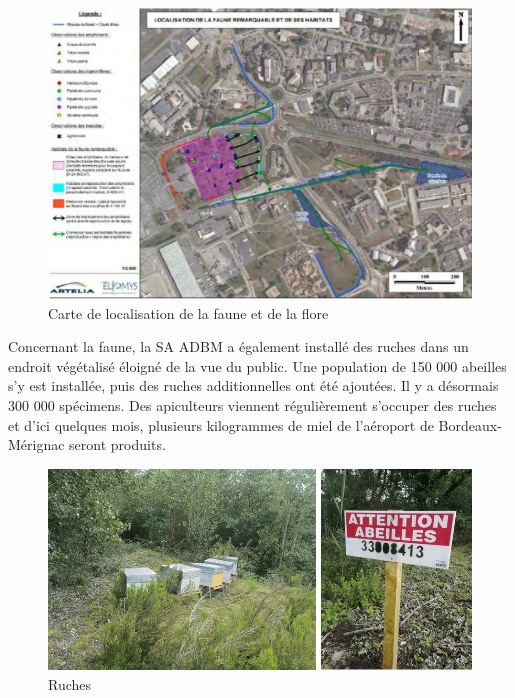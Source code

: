 \begin{figure}[hbt!]
  \centering
  \includegraphics[width=14cm]{Images/carteenvironnement.png}
  \caption{Carte de localisation de la faune et de la flore}
  \label{fig:crapeau}
\end{figure}

Concernant la faune, la SA ADBM a également installé des ruches dans un endroit végétalisé éloigné de la vue du public. Une population de 150 000 abeilles s'y est installée, puis des ruches additionnelles ont été ajoutées. Il y a désormais 300 000 spécimens. Des apiculteurs viennent régulièrement s'occuper des ruches et d'ici quelques mois, plusieurs kilogrammes de miel de l'aéroport de Bordeaux-Mérignac seront produits.

 \begin{figure}[hbt!]
   \centering
   \includegraphics[width=14cm]{Images/ruches.jpg}
   \caption{Ruches}
   \label{fig:abeilles}
 \end{figure}

